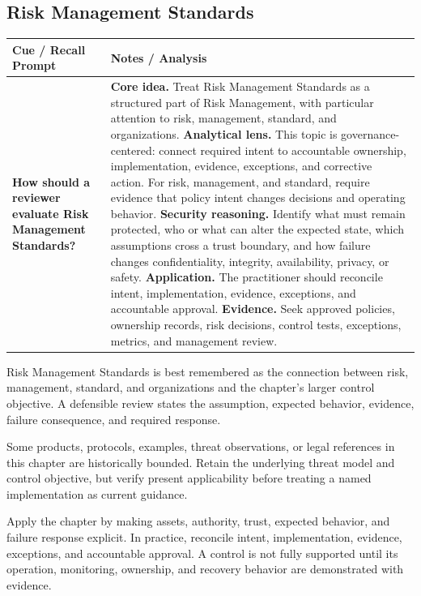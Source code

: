 \documentclass[11pt]{article}
\newcommand{\CornellHeader}{%
\rowcolor{Navy}\color{white}\bfseries Cue / Recall Prompt & \color{white}\bfseries Notes / Analysis\\\hline}
\newcommand{\CornellRow}[2]{%
\cellcolor{CueGray}\RaggedRight\textbf{#1} & \RaggedRight #2\\\hline}
\begin{document}
\subsection*{Risk Management Standards}
\begin{longtable}{>{\RaggedRight\arraybackslash}p{}|>{\RaggedRight\arraybackslash}p{}}
\CornellHeader
\CornellRow{How should a reviewer evaluate Risk Management Standards?}{\textbf{Core idea.} Treat Risk Management Standards as a structured part of Risk Management, with particular attention to risk, management, standard, and organizations. \textbf{Analytical lens.} This topic is governance-centered: connect required intent to accountable ownership, implementation, evidence, exceptions, and corrective action. For risk, management, and standard, require evidence that policy intent changes decisions and operating behavior. \textbf{Security reasoning.} Identify what must remain protected, who or what can alter the expected state, which assumptions cross a trust boundary, and how failure changes confidentiality, integrity, availability, privacy, or safety. \textbf{Application.} The practitioner should reconcile intent, implementation, evidence, exceptions, and accountable approval. \textbf{Evidence.} Seek approved policies, ownership records, risk decisions, control tests, exceptions, metrics, and management review.}
\end{longtable}
\begin{topicsummary}
Risk Management Standards is best remembered as the connection between risk, management, standard, and organizations and the chapter's larger control objective. A defensible review states the assumption, expected behavior, evidence, failure consequence, and required response.
\end{topicsummary}
\begin{historybox}
Some products, protocols, examples, threat observations, or legal references in this chapter are historically bounded. Retain the underlying threat model and control objective, but verify present applicability before treating a named implementation as current guidance.
\end{historybox}
\begin{defensebox}
Apply the chapter by making assets, authority, trust, expected behavior, and failure response explicit. In practice, reconcile intent, implementation, evidence, exceptions, and accountable approval. A control is not fully supported until its operation, monitoring, ownership, and recovery behavior are demonstrated with evidence.
\end{defensebox}
\end{document}
